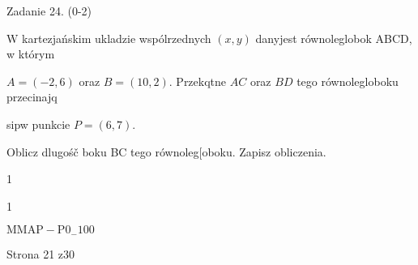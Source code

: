 \documentclass[a4paper,12pt]{article}
\begin{document}
Zadanie 24. (0-2)

$\mathrm{W}$ kartezjańskim ukladzie wspólrzednych $(x,y)$ danyjest równoleglobok ABCD, w którym

$A=(-2,6)$ oraz $B=(10,2)$. Przekqtne $AC$ oraz $BD$ tego równolegloboku przecinajq

sipw punkcie $P=(6,7).$

Oblicz dlugośč boku BC tego równoleg[oboku. Zapisz obliczenia.

1

1

$\mathrm{M}\mathrm{M}\mathrm{A}\mathrm{P}-\mathrm{P}0_{-}100$

Strona 21 z30
\end{document}
